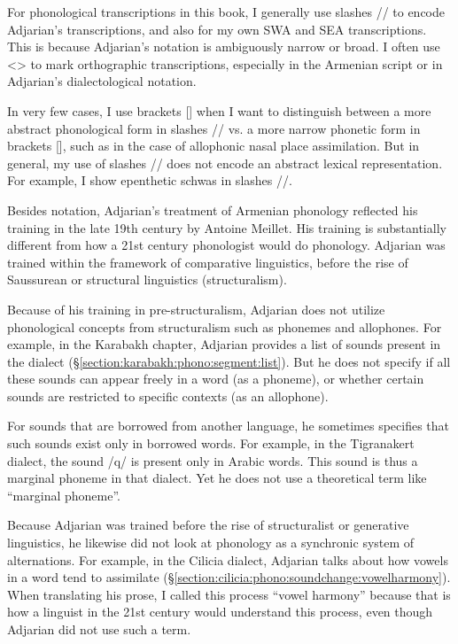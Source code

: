 \documentclass[output=paper]{langscibook}
\begin{document}
For phonological transcriptions in this book, I generally use slashes // to encode Adjarian's transcriptions, and also for my own SWA and SEA transcriptions. This is because Adjarian's notation is ambiguously narrow or broad. I often use <> to mark orthographic transcriptions, especially in the Armenian script or in Adjarian's dialectological notation. 

In very few cases, I use brackets [] when I want to distinguish between a more abstract phonological form in slashes // vs. a more narrow phonetic form in brackets [], such as in the case of allophonic nasal place assimilation. But in general, my use of slashes // does not encode an abstract lexical representation. For example, I show epenthetic schwas in slashes //. 



Besides notation, Adjarian's treatment of Armenian phonology reflected his training in the late 19th century by Antoine Meillet. His training is substantially different from how a 21st century phonologist would do phonology. Adjarian was trained within the framework of comparative linguistics, before the rise of Saussurean or structural linguistics (structuralism). 


Because of his training in pre-structuralism, Adjarian does not utilize phonological concepts from structuralism such as phonemes and allophones. For example, in the Karabakh chapter, Adjarian provides a list of sounds present in the dialect (\S\ref{section:karabakh:phono:segment:list}). But he does not specify if all these sounds can appear freely in a word (as a phoneme), or whether certain sounds are restricted to specific contexts (as an allophone). 
	
For sounds that are borrowed from another language, he sometimes specifies that such sounds exist only in borrowed words. For example, in the Tigranakert dialect, the sound /q/ is present only in Arabic words. This sound is thus a marginal phoneme in that dialect. Yet he does not use   a theoretical term like ``marginal phoneme''.

Because Adjarian was trained before the rise of structuralist or generative linguistics, he likewise did not look at  phonology as a synchronic system of alternations. For example, in the Cilicia dialect, Adjarian talks about how vowels in a word tend to assimilate (\S\ref{section:cilicia:phono:soundchange:vowelharmony}). When translating his prose, I called this process ``vowel harmony'' because that is how a linguist in the 21st century would understand this process, even though Adjarian did not use such a term.
\end{document}
